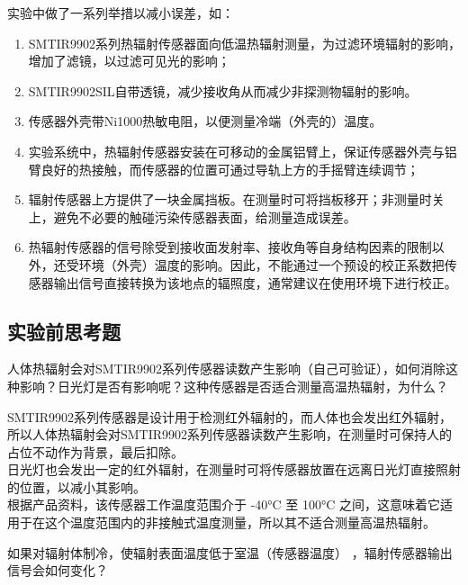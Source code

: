 \documentclass[dvipsnames, svgnames,a4paper,11pt]{article}
\begin{document}
	实验中做了一系列举措以减小误差，如：
	\begin{enumerate}
		\item SMTIR9902系列热辐射传感器面向低温热辐射测量，为过滤环境辐射的影响，增加了滤镜，以过滤可见光的影响；
		\item SMTIR9902SIL自带透镜，减少接收角从而减少非探测物辐射的影响。
		\item 传感器外壳带Ni1000热敏电阻，以便测量冷端（外壳的）温度。
		\item 实验系统中，热辐射传感器安装在可移动的金属铝臂上，保证传感器外壳与铝臂良好的热接触，而传感器的位置可通过导轨上方的手摇臂连续调节；
		\item 辐射传感器上方提供了一块金属挡板。在测量时可将挡板移开；非测量时关上，避免不必要的触碰污染传感器表面，给测量造成误差。
		\item 热辐射传感器的信号除受到接收面发射率、接收角等自身结构因素的限制以外，还受环境（外壳）温度的影响。因此，不能通过一个预设的校正系数把传感器输出信号直接转换为该地点的辐照度，通常建议在使用环境下进行校正。
	\end{enumerate}
	
	




\subsection{实验前思考题}

	\begin{question}
		人体热辐射会对SMTIR9902系列传感器读数产生影响（自己可验证），如何消除这种影响？日光灯是否有影响呢？这种传感器是否适合测量高温热辐射，为什么？
	\end{question}

	SMTIR9902系列传感器是设计用于检测红外辐射的，而人体也会发出红外辐射，所以人体热辐射会对SMTIR9902系列传感器读数产生影响，在测量时可保持人的占位不动作为背景，最后扣除。\\

	日光灯也会发出一定的红外辐射，在测量时可将传感器放置在远离日光灯直接照射的位置，以减小其影响。\\

	根据产品资料，该传感器工作温度范围介于 -40°C 至 100°C 之间，这意味着它适用于在这个温度范围内的非接触式温度测量，所以其不适合测量高温热辐射。


\begin{question}
	如果对辐射体制冷，使辐射表面温度低于室温（传感器温度） ，辐射传感器输出信号会如何变化？
\end{question}
\end{document}

